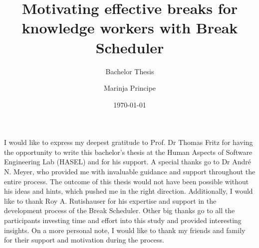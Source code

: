 \documentclass{hasel_thesis}
\date{\today}
\title{Motivating effective breaks for knowledge workers with Break Scheduler}
\subtitle{Bachelor Thesis}
\author{Marinja Principe}
\begin{document}
\maketitle

\frontmatter

\begin{acknowledgements}
I would like to express my deepest gratitude to Prof. Dr Thomas Fritz for having the opportunity to write this bachelor's thesis at the Human Aspects of Software Engineering Lab (HASEL) and for his support. A special thanks go to Dr André N. Meyer, who provided me with invaluable guidance and support throughout the entire process. The outcome of this thesis would not have been possible without his ideas and hints, which pushed me in the right direction. Additionally, I would like to thank Roy A. Rutishauser for his expertise and support in the development process of the Break Scheduler. Other big thanks go to all the participants investing time and effort into this study and provided interesting insights. On a more personal note, I would like to thank my friends and family for their support and motivation during the process.
\end{acknowledgements}
\end{document}

